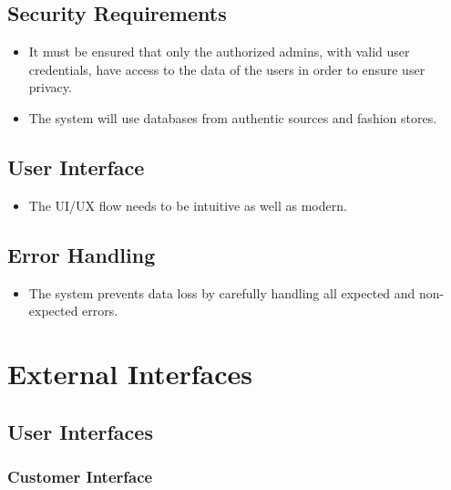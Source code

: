\subsection{Security Requirements}
\begin{itemize}
    \item It must be ensured that only the authorized admins, with valid user credentials, have access to the data of the users in order to ensure user privacy. 
    
    \item The system will use databases from authentic sources and fashion stores.
\end{itemize}

\subsection{User Interface}
\begin{itemize}
    \item The UI/UX flow needs to be intuitive as well as modern. 
\end{itemize}

\subsection{Error Handling}
\begin{itemize}
    \item The system prevents data loss by carefully handling all expected and non-expected errors. 
\end{itemize}

\section{External Interfaces}

\subsection{User Interfaces}

\subsubsection{Customer Interface}

